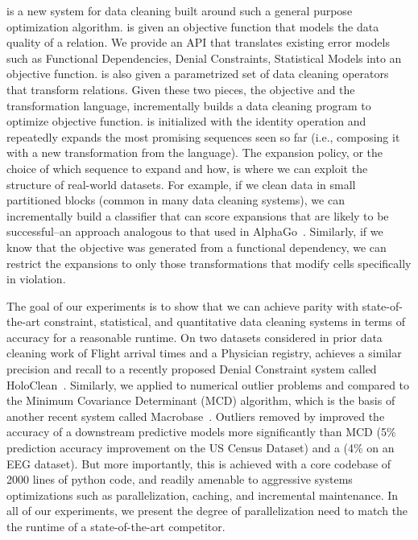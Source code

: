 \sys is a new system for data cleaning built around such a general purpose optimization algorithm.  
\sys is given an objective function that models the data quality of a relation.
We provide an API that translates existing error models such as Functional Dependencies, Denial Constraints, Statistical Models into an objective function.
\sys is also given a parametrized set of data cleaning operators that transform relations.
Given these two pieces, the objective and the transformation language, \sys incrementally builds a data cleaning program to optimize objective function.
\sys is initialized with the identity operation and repeatedly expands the most promising sequences seen so far (i.e., composing it with a new transformation from the language).
The expansion policy, or the choice of which sequence to expand and how, is where we can exploit the structure of real-world datasets.
For example, if we clean data in small partitioned blocks (common in many data cleaning systems), we can incrementally build a classifier that can score expansions that are likely to be successful--an approach analogous to that used in AlphaGo~\cite{silver2016mastering}.
Similarly, if we know that the objective was generated from a functional dependency, we can restrict the expansions to only those transformations that modify cells specifically in violation. 

The goal of our experiments is to show that we can achieve parity with state-of-the-art constraint, statistical, and quantitative data cleaning systems in terms of accuracy for a reasonable runtime.
On two datasets considered in prior data cleaning work of Flight arrival times and a Physician registry, \sys achieves a similar precision and recall to a recently proposed Denial Constraint system called HoloClean~\cite{rekatsinas2017holoclean}. 
Similarly, we applied \sys to numerical outlier problems and compared to the Minimum Covariance Determinant (MCD) algorithm, which is the basis of another recent system called Macrobase~\cite{bailis2016macrobase}.
Outliers removed by \sys  improved the accuracy of a downstream predictive models more significantly than MCD (5\% prediction accuracy improvement on the US Census Dataset) and a (4\% on an EEG dataset). 
But more importantly, this is achieved with a core codebase of 2000 lines of python code, and readily amenable to aggressive systems optimizations such as parallelization, caching, and incremental maintenance.
In all of our experiments, we present the degree of parallelization need to match the the runtime of a state-of-the-art competitor.

